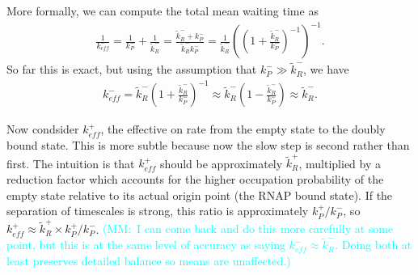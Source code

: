 \documentclass[12pt]{article}%
\newcommand{\rate}[3]{{#1}_{#2}^{#3}}
\newcommand{\mmnote}[1]{\textcolor{cyan}{(MM:~#1)}}
\begin{document}
More formally, we can compute the total mean waiting time as
\begin{align}
    \frac{1}{\rate{k}{eff}{-}}
    = \frac{1}{\rate{k}{P}{-}} + \frac{1}{\rate{\tilde{k}}{R}{-}}
    = \frac{\rate{\tilde{k}}{R}{-} + \rate{k}{P}{-}}
           {\rate{\tilde{k}}{R}{-}   \rate{k}{P}{-}}
    = \frac{1}{\rate{\tilde{k}}{R}{-}}
        \left(
        \left( 1 + \frac{\rate{\tilde{k}}{R}{-}}{\rate{k}{P}{-}}\right)^{-1}
        \right)^{-1}.
\end{align}
So far this is exact, but using the assumption that
$\rate{k}{P}{-} \gg \rate{\tilde{k}}{R}{-}$, we have
\begin{align}
    \rate{k}{eff}{-}
    = \rate{\tilde{k}}{R}{-}
        \left( 1 + \frac{\rate{\tilde{k}}{R}{-}}{\rate{k}{P}{-}}\right)^{-1}
    \approx \rate{\tilde{k}}{R}{-}
        \left( 1 - \frac{\rate{\tilde{k}}{R}{-}}{\rate{k}{P}{-}}\right)
    \approx \rate{\tilde{k}}{R}{-}.
\end{align}

Now condsider $\rate{k}{eff}{+}$,
the effective on rate from the empty state to the doubly bound state.
This is more subtle because now the slow step is second rather than first.
The intuition is that $\rate{k}{eff}{+}$ should be approximately
$\rate{\tilde{k}}{R}{+}$, multiplied by a reduction factor which accounts for
the higher occupation probability of the empty state relative to
its actual origin point (the RNAP bound state).
If the separation of timescales is strong,
this ratio is approximately $\rate{k}{P}{+}/\rate{k}{P}{-}$,
so $\rate{k}{eff}{+} \approx
    \rate{\tilde{k}}{R}{+}\times\rate{k}{P}{+}/\rate{k}{P}{-}$.
\mmnote{I can come back and do this more carefully at some point,
but this is at the same level of accuracy as saying
$\rate{k}{eff}{-} \approx \rate{\tilde{k}}{R}{-}$.
Doing both at least preserves detailed balance so means are unaffected.}
\end{document}
